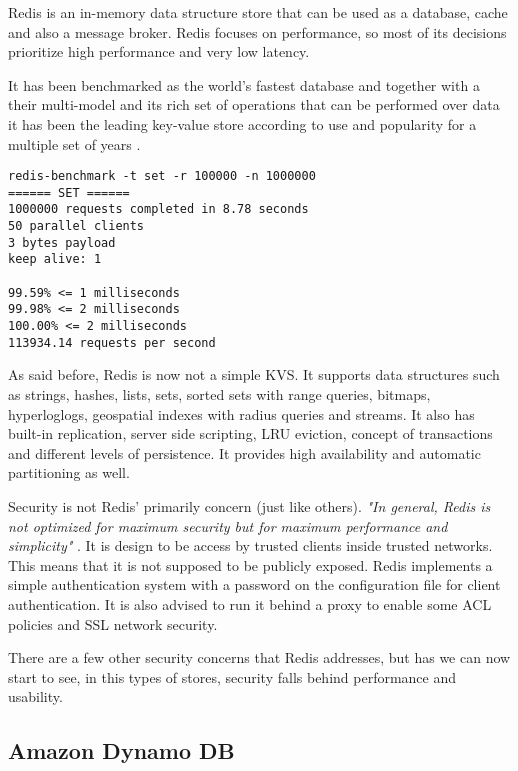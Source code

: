 Redis \cite{redis:1} is an in-memory data structure store that can be used as a database, cache and also a message broker. Redis focuses on performance, so most of its decisions prioritize high performance and very low latency.

It has been benchmarked as the world's fastest database \cite{redis:3} and together with a their multi-model and its rich set of operations that can be performed over data it has been the leading key-value store according to use and popularity for a multiple set of years \cite{db-engine:2}.

\lstset{language=Bash, caption=How Fast is Redis, label=lst:redisBenchmark}
\begin{lstlisting}
redis-benchmark -t set -r 100000 -n 1000000
====== SET ======
1000000 requests completed in 8.78 seconds
50 parallel clients
3 bytes payload
keep alive: 1

99.59% <= 1 milliseconds
99.98% <= 2 milliseconds
100.00% <= 2 milliseconds
113934.14 requests per second
\end{lstlisting}

As said before, Redis is now not a simple \gls{KVS}. It supports data structures such as strings, hashes, lists, sets, sorted sets with range queries, bitmaps, hyperloglogs, geospatial indexes with radius queries and streams. It also has built-in replication, server side scripting, \gls{LRU} eviction, concept of transactions and different levels of persistence. It provides high availability and automatic partitioning as well.

Security is not Redis' primarily concern (just like others). \textit{"In general, Redis is not optimized for maximum security but for maximum performance and simplicity"} \cite{redis:4}. It is design to be access by trusted clients inside trusted networks. This means that it is not supposed to be publicly exposed. Redis implements a simple authentication system with a password on the configuration file for client authentication.
It is also advised to run it behind a proxy to enable some \gls{ACL} policies and \gls{SSL} network security.

There are a few other security concerns that Redis addresses, but has we can now start to see, in this types of stores, security falls behind performance and usability.

\subsection{Amazon Dynamo DB}
\label{ssec:amazon_dynamo_db}

